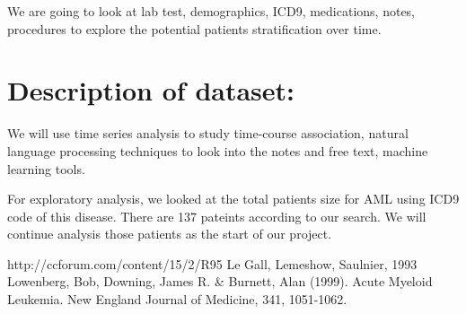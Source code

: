 \documentclass[a4paper,11pt]{article}\usepackage{graphicx, color}
\begin{document}
We are going to look at  lab test, demographics, ICD9, medications, notes, procedures to explore the potential patients stratification over time. 

\section{Description of dataset:}

We will use time series analysis to study time-course association, natural language processing techniques to look into the notes and free text, machine learning tools. 

For exploratory analysis, we looked at the total patients size for AML using ICD9 code of this disease. There are 137 pateints according to our search. We will continue analysis those patients as the start of our project.


\begin{thebibliography}{9}

 \label{1} http://ccforum.com/content/15/2/R95
 \label{2} Le Gall, Lemeshow, Saulnier, 1993
 \label{3} Lowenberg, Bob, Downing, James R. \& Burnett, Alan (1999). Acute Myeloid Leukemia. New England Journal of Medicine, 341, 1051-1062.

\end{thebibliography}
\end{document}
